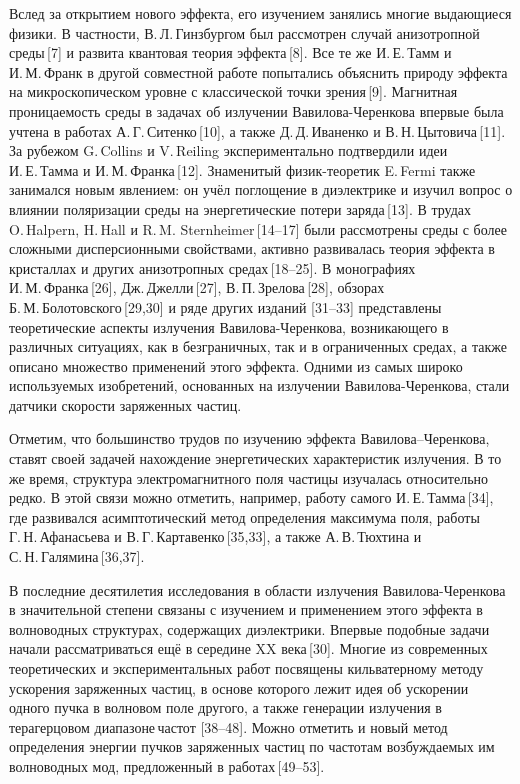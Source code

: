 Вслед за открытием нового эффекта, его изучением занялись многие выдающиеся физики. В частности, В. Л. Гинзбургом был рассмотрен случай анизотропной среды [7] и развита квантовая теория эффекта [8]. Все те же И. Е. Тамм и И. М. Франк в другой совместной работе попытались объяснить природу эффекта на микроскопическом уровне с классической точки зрения [9]. Магнитная проницаемость среды в задачах об излучении Вавилова-Черенкова впервые была учтена в работах А. Г. Ситенко [10], а также Д. Д. Иваненко и В. Н. Цытовича [11]. За рубежом G. Collins и V. Reiling экспериментально подтвердили идеи И. Е. Тамма и И. М. Франка [12]. Знаменитый физик-теоретик E. Fermi также занимался новым явлением: он учёл поглощение в диэлектрике и изучил вопрос о влиянии поляризации среды на энергетические потери заряда [13]. В трудах O. Halpern, H. Hall и R. M. Sternheimer [14–17] были рассмотрены среды с более сложными дисперсионными свойствами, активно развивалась теория эффекта в кристаллах и других анизотропных средах [18–25]. В монографиях И. М. Франка [26], Дж. Джелли [27], В. П. Зрелова [28], обзорах Б. М. Болотовского [29,30] и ряде других изданий [31–33] представлены теоретические аспекты излучения Вавилова-Черенкова, возникающего в различных ситуациях, как в безграничных, так и в ограниченных средах, а также описано множество применений этого эффекта. Одними из самых широко используемых изобретений, основанных на излучении Вавилова-Черенкова, стали датчики скорости заряженных частиц.

Отметим, что большинство трудов по изучению эффекта Вавилова–Черенкова, ставят своей задачей нахождение энергетических характеристик излучения. В то же время, структура электромагнитного поля частицы изучалась относительно редко. В этой связи можно отметить, например, работу самого И. Е. Тамма [34], где развивался асимптотический метод определения максимума поля, работы Г. Н. Афанасьева и В. Г. Картавенко [35,33], а также А. В. Тюхтина и С. Н. Галямина [36,37].

В последние десятилетия исследования в области излучения Вавилова-Черенкова в значительной степени связаны с изучением и применением этого эффекта в волноводных структурах, содержащих диэлектрики. Впервые подобные задачи начали рассматриваться ещё в середине XX века [30]. Многие из современных теоретических и экспериментальных работ посвящены кильватерному методу ускорения заряженных частиц, в основе которого лежит идея об ускорении одного пучка в волновом поле другого, а также генерации излучения в терагерцовом диапазоне частот [38–48]. Можно отметить и новый метод определения энергии пучков заряженных частиц по частотам возбуждаемых им волноводных мод, предложенный в работах [49–53].

